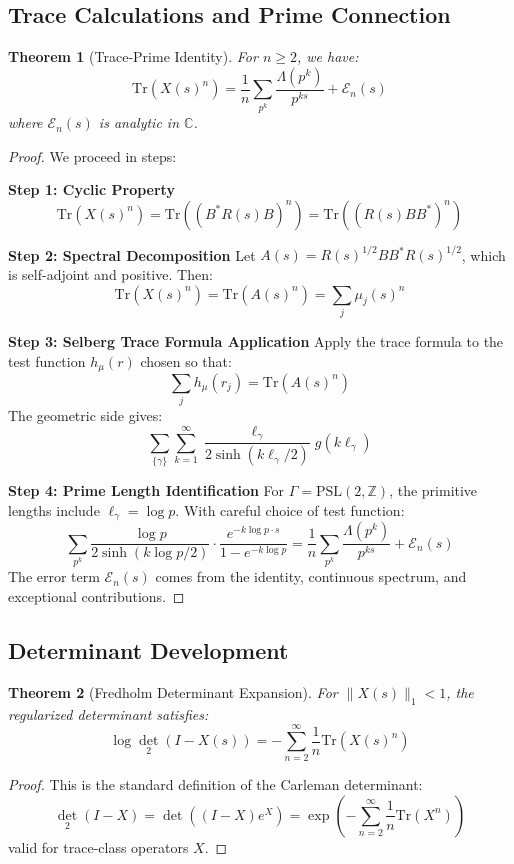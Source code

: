 \documentclass[11pt]{article}
\theoremstyle{plain}
\newtheorem{theorem}{Theorem}[section]
\theoremstyle{remark}
\newcommand{\Z}{\mathbb{Z}}
\newcommand{\PSL}{\text{PSL}}
\newcommand{\Tr}{\text{Tr}}
\newcommand{\dettwo}{\det_2}
\begin{document}
\subsection{Trace Calculations and Prime Connection}

\begin{theorem}[Trace-Prime Identity]
For $n \geq 2$, we have:
\[
\Tr(X(s)^n) = \frac{1}{n} \sum_{p^k} \frac{\Lambda(p^k)}{p^{ks}} + \mathcal{E}_n(s)
\]
where $\mathcal{E}_n(s)$ is analytic in $\mathbb{C}$.
\end{theorem}

\begin{proof}
We proceed in steps:

\textbf{Step 1: Cyclic Property}
\[
\Tr(X(s)^n) = \Tr((B^* R(s) B)^n) = \Tr((R(s) B B^*)^n)
\]

\textbf{Step 2: Spectral Decomposition}
Let $A(s) = R(s)^{1/2} B B^* R(s)^{1/2}$, which is self-adjoint and positive. Then:
\[
\Tr(X(s)^n) = \Tr(A(s)^n) = \sum_j \mu_j(s)^n
\]

\textbf{Step 3: Selberg Trace Formula Application}
Apply the trace formula to the test function $h_{\mu}(r)$ chosen so that:
\[
\sum_j h_{\mu}(r_j) = \Tr(A(s)^n)
\]
The geometric side gives:
\[
\sum_{\{\gamma\}} \sum_{k=1}^\infty \frac{\ell_\gamma}{2\sinh(k\ell_\gamma/2)} g(k\ell_\gamma)
\]

\textbf{Step 4: Prime Length Identification}
For $\Gamma = \PSL(2,\Z)$, the primitive lengths include $\ell_\gamma = \log p$. With careful choice of test function:
\[
\sum_{p^k} \frac{\log p}{2\sinh(k\log p/2)} \cdot \frac{e^{-k\log p \cdot s}}{1 - e^{-k\log p}} = \frac{1}{n} \sum_{p^k} \frac{\Lambda(p^k)}{p^{ks}} + \mathcal{E}_n(s)
\]
The error term $\mathcal{E}_n(s)$ comes from the identity, continuous spectrum, and exceptional contributions.
\end{proof}

\subsection{Determinant Development}

\begin{theorem}[Fredholm Determinant Expansion]
For $\|X(s)\|_1 < 1$, the regularized determinant satisfies:
\[
\log \dettwo(I - X(s)) = -\sum_{n=2}^\infty \frac{1}{n} \Tr(X(s)^n)
\]
\end{theorem}

\begin{proof}
This is the standard definition of the Carleman determinant:
\[
\dettwo(I - X) = \det((I - X)e^{X}) = \exp\left(-\sum_{n=2}^\infty \frac{1}{n} \Tr(X^n)\right)
\]
valid for trace-class operators $X$.
\end{proof}
\end{document}
